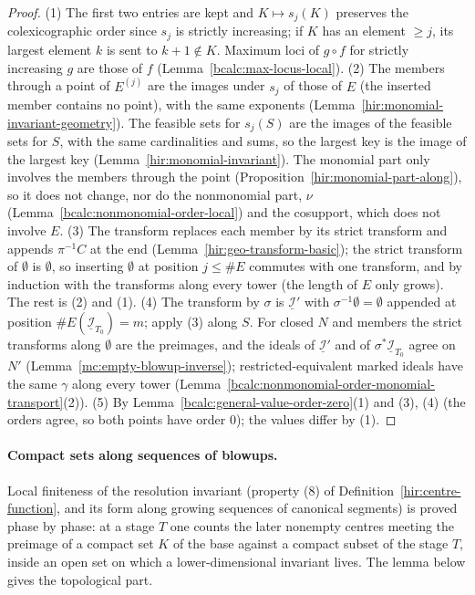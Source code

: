 \begin{proof}
\leanok
(1) The first two entries are kept and \(K\mapsto s_j(K)\) preserves the colexicographic order since \(s_j\) is strictly increasing; if \(K\) has an element \(\ge j\), its
largest element \(k\) is sent to \(k+1\notin K\). Maximum loci of \(g\circ f\) for strictly increasing \(g\) are those of \(f\) (Lemma~\ref{bcalc:max-locus-local}).
(2) The members through a point of \(E^{(j)}\) are the images under \(s_j\) of those of \(E\) (the inserted member contains no point), with the same exponents
(Lemma~\ref{hir:monomial-invariant-geometry}). The feasible sets for \(s_j(S)\) are the images of the feasible sets for \(S\), with the same cardinalities and sums, so
the largest key is the image of the largest key (Lemma~\ref{hir:monomial-invariant}). The monomial part only involves the members through the point
(Proposition~\ref{hir:monomial-part-along}), so it does not change, nor do the nonmonomial part, \(\nu\) (Lemma~\ref{bcalc:nonmonomial-order-local}) and the cosupport, which
does not involve \(E\).
(3) The transform replaces each member by its strict transform and appends \(\pi^{-1}C\) at the end (Lemma~\ref{hir:geo-transform-basic}); the strict transform of
\(\emptyset\) is \(\emptyset\), so inserting \(\emptyset\) at position \(j\le\#E\) commutes with one transform, and by induction with the transforms along every tower (the
length of \(E\) only grows). The rest is (2) and (1).
(4) The transform by \(\sigma\) is \(\underline{\mathcal I}'\) with \(\sigma^{-1}\emptyset=\emptyset\) appended at position \(\#E(\underline{\mathcal I}_{T_0})=m\); apply (3) along \(S\). For closed
\(N\) and members the strict transforms along \(\emptyset\) are the preimages, and the ideals of \(\underline{\mathcal I}'\) and of \(\sigma^*\underline{\mathcal I}_{T_0}\) agree on
\(N'\) (Lemma~\ref{mc:empty-blowup-inverse}); restricted-equivalent marked ideals have the same \(\gamma\) along every tower
(Lemma~\ref{bcalc:nonmonomial-order-monomial-transport}(2)).
(5) By Lemma~\ref{bcalc:general-value-order-zero}(1) and (3), (4) (the orders agree, so both points have order \(0\)); the values differ by (1).
\end{proof}

\paragraph{Compact sets along sequences of blowups.} Local finiteness of the resolution invariant (property (8) of
Definition~\ref{hir:centre-function}, and its form along growing sequences of canonical segments) is proved phase by phase: at a stage \(T\) one counts the later nonempty centres meeting the
preimage of a compact set \(K\) of the base against a compact subset of the stage \(T\), inside an open set on which a lower-dimensional invariant lives.
The lemma below gives the topological part.

